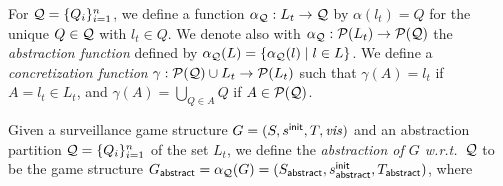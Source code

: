 For $\mathcal{Q} = \{Q_i\}_{i=1}^n$,  we define a function $\alpha_{\mathcal{Q}} : L_t \to \mathcal{Q}$ by $\alpha(l_t) = Q$ for the unique $Q \in \mathcal{Q}$ with $l_t \in Q$. We denote also with $\alpha_{\mathcal{Q}} : \mathcal{P}(L_t) \to \mathcal{P}(\mathcal{Q})$ the \emph{abstraction function} defined by $\alpha_{\mathcal{Q}}(L) = \{\alpha_{\mathcal{Q}}(l) \mid l \in L\}$.
We define a \emph{concretization function} $\gamma :  \mathcal{P}(\mathcal{Q}) \cup L_t \to \mathcal{P}(L_t)$ such that 
$\gamma(A) = l_t$ if $A = l_t \in L_t$, and  $\gamma(A) = \bigcup_{Q \in A} Q$ if $A \in \mathcal{P}(\mathcal{Q})$.

Given a surveillance game structure $G  = (S,s^{\mathsf{init}},T,\mathit{vis})$ and an abstraction partition $\mathcal{Q} = \{Q_i\}_{i=1}^n$ of the set $L_t$, we define the \emph{abstraction of $G$ w.r.t.\ $\mathcal{Q}$} to be the game structure 
$G_{\mathsf{abstract}}  = \alpha_{\mathcal{Q}}(G)= (S_{\mathsf{abstract}},s^{\mathsf{init}}_{\mathsf{abstract}},T_{\mathsf{abstract}})$, where


